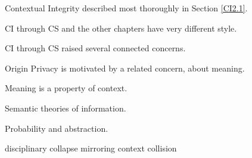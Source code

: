 \documentclass[../thesis.tex]{subfiles}
\begin{document}
Contextual Integrity described most thoroughly in Section \ref{CI2.1}.
 
 CI through CS and the other chapters have very different style.

 CI through CS raised several connected concerns.

 Origin Privacy is motivated by a related concern,
 about meaning.

 Meaning is a property of context.

 Semantic theories of information.

 Probability and abstraction.

disciplinary collapse mirroring context collision 

 
\end{document}
